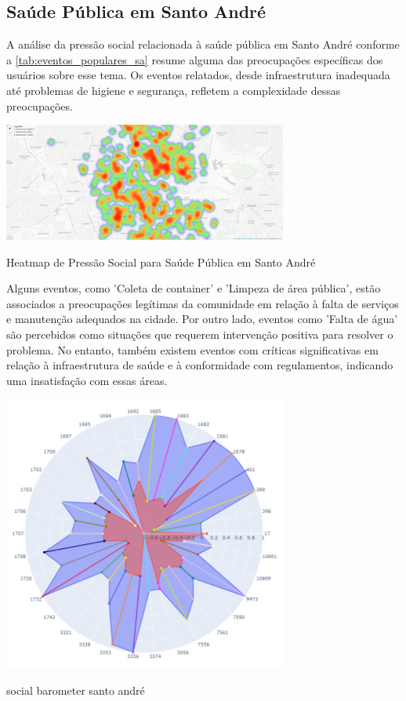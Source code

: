 \subsection{Saúde Pública em Santo André}

A análise da pressão social relacionada à saúde pública em Santo André conforme a \autoref{tab:eventos_populares_sa} resume alguma das preocupações específicas dos usuários sobre esse tema. Os eventos relatados, desde infraestrutura inadequada até problemas de higiene e segurança, refletem a complexidade dessas preocupações.

\begin{quadro}[htb]
	\centering
	\includegraphics[width=0.7\textwidth]{images/heatmap_santo_andre.PNG}
	\caption{Heatmap de Pressão Social para Saúde Pública em Santo André}
	\label{fig:heatmap_santo_andre}
\end{quadro}

Alguns eventos, como 'Coleta de container' e 'Limpeza de área pública', estão associados a preocupações legítimas da comunidade em relação à falta de serviços e manutenção adequados na cidade. Por outro lado, eventos como 'Falta de água' são percebidos como situações que requerem intervenção positiva para resolver o problema. No entanto, também existem eventos com críticas significativas em relação à infraestrutura de saúde e à conformidade com regulamentos, indicando uma insatisfação com essas áreas.

\begin{quadro}[htb]
	\centering
	\includegraphics[width=0.7\textwidth]{images/social_barometer_santo_andre.png}
	\caption{social barometer santo andré}
	\label{fig:social_barometer_santo_andre}
\end{quadro}

